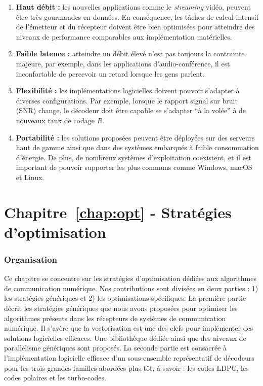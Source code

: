 \begin{enumerate}
  \item \textbf{Haut débit :}
    les nouvelles applications comme le \emph{streaming} vidéo, peuvent être
    très gourmandes en données. En conséquence, les tâches de calcul intensif de
    l'émetteur et du récepteur doivent être bien optimisées pour atteindre des
    niveaux de performance comparables aux implémentation matérielles.

  \item \textbf{Faible latence :}
    atteindre un débit élevé n'est pas toujours la contrainte majeure, par
    exemple, dans les applications d'audio-conférence, il est inconfortable de
    percevoir un retard lorsque les gens parlent.

  \item \textbf{Flexibilité :}
    les implémentations logicielles doivent pouvoir s'adapter à diverses
    configurations. Par exemple, lorsque le rapport signal sur bruit (SNR)
    change, le décodeur doit être capable se s'adapter ``à la volée'' à de
    nouveaux taux de codage $R$.

  \item \textbf{Portabilité :}
    les solutions proposées peuvent être déployées sur des serveurs haut de
    gamme ainsi que dans des systèmes embarqués à faible consommation d'énergie.
    De plus, de nombreux systèmes d'exploitation coexistent, et il est important
    de pouvoir supporter les plus communs comme Windows, macOS et Linux.
\end{enumerate}

\section*{Chapitre~\ref{chap:opt} - Stratégies d'optimisation}

\subsubsection*{Organisation}

Ce chapitre se concentre sur les stratégies d'optimisation dédiées aux
algorithmes de communication numérique. Nos contributions sont divisées en deux
parties : 1) les stratégies génériques et 2) les optimisations spécifiques.
La première partie décrit les stratégies génériques que nous avons proposées
pour optimiser les algorithmes présents dans les récepteurs de systèmes de
communication numérique. Il s'avère que la vectorisation est une des clefs pour
implémenter des solutions logicielles efficaces. Une bibliothèque dédiée ainsi
que des niveaux de parallélisme génériques sont proposés. La seconde partie est
consacrée à l'implémentation logicielle efficace d'un sous-ensemble
représentatif de décodeurs pour les trois grandes familles abordées plus tôt, à
savoir : les codes LDPC, les codes polaires et les turbo-codes.


